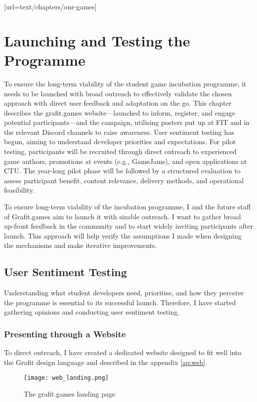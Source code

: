 [url=text/chapters/our-games]
\chapter{Launching and Testing the Programme}\label{chap:launch-testing}

\begin{chapterabstract}
	To ensure the long-term viability of the student game incubation programme, it needs to be launched with broad outreach to effectively validate the chosen approach with direct user feedback and adaptation on the go. This chapter describes the grafit.games website—launched to inform, register, and engage potential participants—and the campaign, utilising posters put up at FIT and in the relevant Discord channels to raise awareness. User sentiment testing has begun, aiming to understand developer priorities and expectations. For pilot testing, participants will be recruited through direct outreach to experienced game authors, promotions at events (e.g., GameJams), and open applications at CTU. The year-long pilot phase will be followed by a structured evaluation to assess participant benefit, content relevance, delivery methods, and operational feasibility.
\end{chapterabstract}

To ensure long-term viability of the incubation programme, I and the future staff of Grafit.games aim to launch it with sizable outreach. I want to gather broad up-front feedback in the community and to start widely inviting participants after launch. This approach will help verify the assumptions I made when designing the mechanisms and make iterative improvements.

\section{User Sentiment Testing}
Understanding what student developers need, prioritise, and how they perceive the programme is essential to its successful launch. Therefore, I have started gathering opinions and conducting user sentiment testing.

\subsection{Presenting through a Website}
To direct outreach, I have created a dedicated website designed to fit well into the Grafit design language and described in the appendix \ref{ap:web}.
\begin{figure}[H]
    \texttt{[image: web\_landing.png]}
    \caption{The grafit.games landing page}
    \label{fig:web_landing}
\end{figure}

